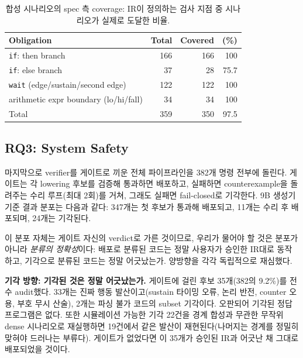 \documentclass[sigconf,nonacm,anonymous,review]{acmart}
\begin{document}
\begin{table}[t]
\centering
\caption{합성 시나리오의 spec 측 coverage: IR이 정의하는 검사 지점 중 시나리오가 실제로 도달한 비율.}
\label{tab:coverage}
\small
\begin{tabular}{lrrr}
\toprule
Obligation & Total & Covered & (\%) \\
\midrule
\texttt{if}: then branch            & 166 & 166 & 100 \\
\texttt{if}: else branch            & 37  & 28  & 75.7 \\
\texttt{wait} (edge/sustain/second edge) & 122 & 122 & 100 \\
arithmetic expr boundary (lo/hi/fall) & 34  & 34  & 100 \\
\midrule
Total                               & 359 & 350 & 97.5 \\
\bottomrule
\end{tabular}
\end{table}

\subsection{RQ3: System Safety}

마지막으로 verifier를 게이트로 끼운 전체 파이프라인을 382개 명령 전부에 돌린다. 게이트는 각 lowering 후보를 검증해 통과하면 배포하고, 실패하면 counterexample을 돌려주는 수리 루프(최대 2회)를 거쳐, 그래도 실패면 fail-closed로 기각한다. 9B 생성기 기준 결과 분포는 다음과 같다: 347개는 첫 후보가 통과해 배포되고, 11개는 수리 후 배포되며, 24개는 기각된다.

이 분포 자체는 게이트 자신의 verdict로 가른 것이므로, 우리가 물어야 할 것은 분포가 아니라 \emph{분류의 정확성}이다: 배포로 분류된 코드는 정말 사용자가 승인한 IR대로 동작하고, 기각으로 분류된 코드는 정말 어긋났는가. 양방향을 각각 독립적으로 재심했다.

\textbf{기각 방향: 기각된 것은 정말 어긋났는가.} 게이트에 걸린 후보 35개(382의 9.2\%)를 전수 audit했다. 33개는 진짜 행동 발산이고(sustain 타이밍 오류, 논리 반전, counter 오용, 부호 무시 산술), 2개는 파싱 불가 코드의 subset 기각이다. 오판되어 기각된 정답 프로그램은 없다. 또한 시뮬레이션 가능한 기각 22건을 경계 합성과 무관한 무작위 dense 시나리오로 재실행하면 19건에서 같은 발산이 재현된다(나머지는 경계를 정밀히 맞혀야 드러나는 부류다). 게이트가 없었다면 이 35개가 승인된 IR과 어긋난 채 그대로 배포되었을 것이다.
\end{document}
